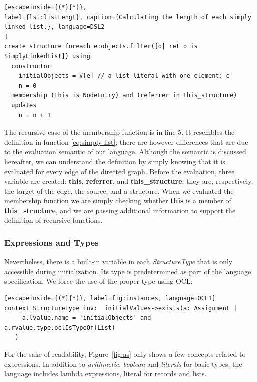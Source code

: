 \begin{lstlisting}[escapeinside={(*}{*)}, 
label={lst:listLengt}, caption={Calculating the length of each simply linked list.}, language=DSL2
]
create structure foreach e:objects.filter([o| ret o is SimplyLinkedList]) using
  constructor
    initialObjects = #[e] // a list literal with one element: e
    n = 0
  membership (this is NodeEntry) and (referrer in this_structure)
  updates 
    n = n + 1
\end{lstlisting}

The recursive case of the membership function is in line 5.
It resembles the definition in function \ref{eq:simply-list}; there are however differences that are due to the evaluation semantic of our language.
Although the semantic is discussed hereafter, we can understand the definition by simply knowing that it is evaluated for every edge of the directed graph.
Before the evaluation, three variable are created: \textbf{this}, \textbf{referrer}, and \textbf{this\_structure}; they are, respectively, the target of the edge, the source, and a structure.
When we evaluated the membership function we are simply checking whether \textbf{this} is a member of \textbf{this\_structure}, and we are passing additional information to support the definition of recursive functions.



\subsubsection*{Expressions and Types}


Nevertheless, there is a built-in variable in each \textit{StructureType} that is only accessible during initialization.
Its type is predetermined as part of the language specification.
We force the use of the proper type using OCL:

\begin{lstlisting}[escapeinside={(*}{*)}, label=fig:instances, language=OCL1]
context StructureType inv:  initialValues->exists(a: Assignment | 
     a.lvalue.name = 'initialObjects' and a.rvalue.type.oclIsTypeOf(List)
   ) 
\end{lstlisting}


For the sake of readability, Figure~\ref{fig:as} only shows a few concepts related to expressions.
In addition to \textit{arithmetic}, \textit{boolean} and \textit{literals} for basic types, the language includes lambda expressions, literal for records and lists.

